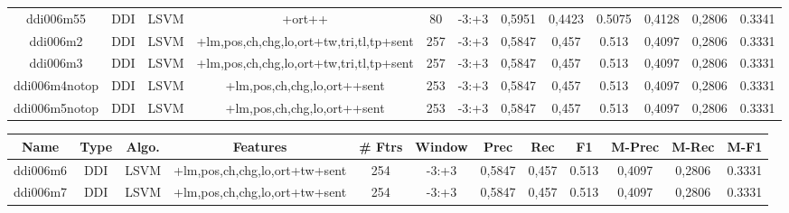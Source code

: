 \documentclass[a4paper]{article}
\begin{document}
\begin{landscape}
\begin{center}
\begin{tabular}{ |c|c|c|c|c|c|c|c|c|c|c|c|}
 	
 
 	
 		
 		\small{ ddi006m55 } & DDI & LSVM & +ort++  &  80 &  -3:+3  &  0,5951 & 0,4423 & 0.5075  &  0,4128 & 0,2806 & 0.3341 \\
 		

 	
 
 	
 		
 		\small{ ddi006m2 } & DDI & LSVM & +lm,pos,ch,chg,lo,ort+tw,tri,tl,tp+sent  &  257 &  -3:+3  &  0,5847 & 0,457 & 0.513  &  0,4097 & 0,2806 & 0.3331 \\
 		

 	
 
 	
 		
 		\small{ ddi006m3 } & DDI & LSVM & +lm,pos,ch,chg,lo,ort+tw,tri,tl,tp+sent  &  257 &  -3:+3  &  0,5847 & 0,457 & 0.513  &  0,4097 & 0,2806 & 0.3331 \\
 		

 	
 
 	
 		
 		\small{ ddi006m4notop } & DDI & LSVM & +lm,pos,ch,chg,lo,ort++sent  &  253 &  -3:+3  &  0,5847 & 0,457 & 0.513  &  0,4097 & 0,2806 & 0.3331 \\
 		

 	
 
 	
 		
 		\small{ ddi006m5notop } & DDI & LSVM & +lm,pos,ch,chg,lo,ort++sent  &  253 &  -3:+3  &  0,5847 & 0,457 & 0.513  &  0,4097 & 0,2806 & 0.3331 \\
 		
 \hline
\end{tabular}
\end{center}




\begin{center}
\begin{tabular}{ |c|c|c|c|c|c|c|c|c|c|c|c|} 
 \hline
 	Name & Type & Algo. & Features & \# Ftrs & Window & Prec & Rec & F1 & M-Prec & M-Rec & M-F1\\
 \hline

 		

 	
 
 	
 		
 		\small{ ddi006m6 } & DDI & LSVM & +lm,pos,ch,chg,lo,ort+tw+sent  &  254 &  -3:+3  &  0,5847 & 0,457 & 0.513  &  0,4097 & 0,2806 & 0.3331 \\
 		

 	
 
 	
 		
 		\small{ ddi006m7 } & DDI & LSVM & +lm,pos,ch,chg,lo,ort+tw+sent  &  254 &  -3:+3  &  0,5847 & 0,457 & 0.513  &  0,4097 & 0,2806 & 0.3331 \\
 		


\end{tabular}
\end{center}
\end{landscape}
\end{document}
